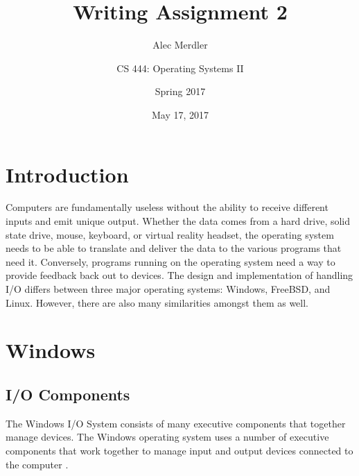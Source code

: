 \documentclass[letterpaper,draftclsnofoot,10pt,onecolumn,titlepage]{IEEEtran}\usepackage[margin=0.75in]{geometry}
\title{Writing Assignment 2}
\author{
	Alec Merdler\\
	\and
	CS 444: Operating Systems II\\
	\and
	Spring 2017\\
}
\date{May 17, 2017}
\begin{document}
\begin{titlepage}
\clearpage\maketitle
\thispagestyle{empty}

\maketitle
\end{titlepage}

\section{Introduction}
Computers are fundamentally useless without the ability to receive different inputs and emit unique output.
Whether the data comes from a hard drive, solid state drive, mouse, keyboard, or virtual reality headset,
the operating system needs to be able to translate and deliver the data to the various programs that need
it. Conversely, programs running on the operating system need a way to provide feedback back out to 
devices. The design and implementation of handling I/O differs between three major operating systems: Windows,
FreeBSD, and Linux. However, there are also many similarities amongst them as well.

\section{Windows}
 
\subsection{I/O Components}
The Windows I/O System consists of many executive components that together manage devices.
The Windows operating system uses a number of executive components that work together to manage input and 
output devices connected to the computer \cite{Windows}.
\end{document}
